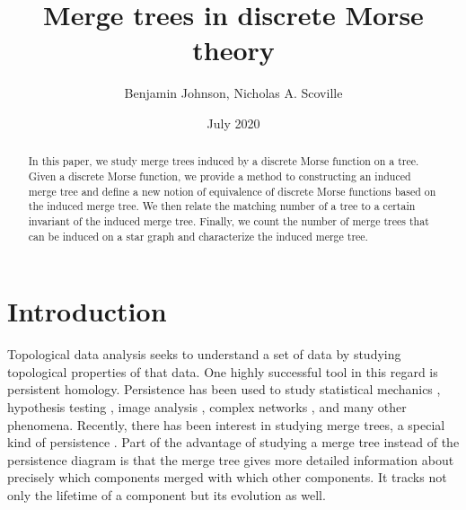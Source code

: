 \documentclass{article}
\title{Merge trees in discrete Morse theory}
\author{Benjamin Johnson, Nicholas A. Scoville}
\date{July 2020}
\theoremstyle{definition}
\begin{document}

\maketitle

\begin{abstract}
In this paper, we study merge trees induced by a discrete Morse function on a tree.  Given a discrete Morse function, we provide a method to constructing an induced merge tree and define a new notion of equivalence of discrete Morse functions based on the induced merge tree.  We then relate the matching number of a tree to a certain invariant of the induced merge tree. Finally, we count the number of merge trees that can be induced on a star graph and characterize the induced merge tree.
\end{abstract}

\section{Introduction}

Topological data analysis seeks to understand a set of data by studying topological properties of that data.  One highly successful tool in this regard is persistent homology.  Persistence has been used to study statistical mechanics \cite{mech17}, hypothesis testing \cite{Hyp14}, image analysis \cite{Carl09}, complex networks \cite{Sco17}, and many other phenomena.  Recently, there has been interest in studying merge trees, a special kind of persistence \cite{Lamdge,Oster}. Part of the advantage of studying a merge tree instead of the persistence diagram is that the merge tree gives more detailed information about precisely which components merged with which other components.  It tracks not only the lifetime of a component but its evolution as well.
\end{document}
